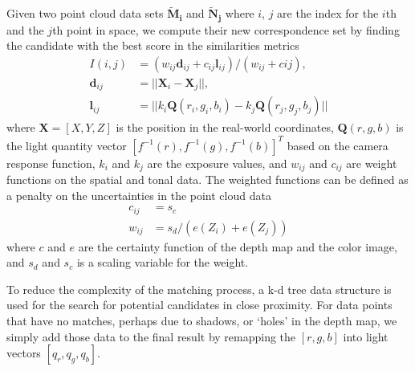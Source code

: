 Given two point cloud data sets  $\mathbf{\tilde{M}_{i}}$ and $\mathbf{\tilde{N}_{j}}$ where $i$, $j$ are the index for the $i$th and the $j$th point in space, we compute their new correspondence set by finding the candidate with the best score in the similarities metrics 
\begin{equation}
\label{eq_match_3d_point} 
\begin{split}
I(i,j) &= (w_{ij}\mathbf{d}_{ij} + c_{ij}\mathbf{l}_{ij})/(w_{ij} + c{ij}), \\
\mathbf{d}_{ij} &= || \mathbf{X}_i - \mathbf{X}_j ||, \\
\mathbf{l}_{ij} &= ||{k_i\mathbf{Q}(r_i,g_i,b_i)-k_j\mathbf{Q}(r_j,g_j,b_j)}||
\end{split}
\end{equation}
where $\mathbf{X}=[X, Y, Z]$ is the position in the real-world coordinates, $\mathbf{Q}(r,g,b)$ is the light quantity vector $[f^{-1}(r), f^{-1}(g), f^{-1}(b)]^T$ based on the camera response function, $k_i$ and $k_j$ are the exposure values, and $w_{ij}$ and $c_{ij}$ are weight functions on the spatial and tonal data. 
The weighted functions can be defined as a penalty on the uncertainties in the point cloud data 
\begin{equation}
\begin{split}
c_{ij} &= s_c \\
w_{ij} &= s_d/(e(Z_i) + e(Z_j))
\end{split}
\end{equation}
where $c$ and $e$ are the certainty function of the depth map and the color image, and $s_d$ and $s_c$ is a scaling variable for the weight.

To reduce the complexity of the matching process, a k-d tree data structure is used for the search for potential candidates in close proximity. For data points that have no matches, perhaps due to shadows, or `holes' in the depth map, we simply add those data to the final result by remapping the $[r, g, b]$ into light vectors $[q_r, q_g, q_b]$. 



